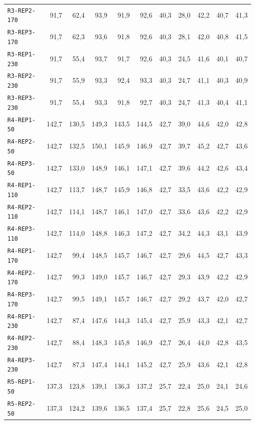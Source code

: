 \begin{longtable}{@{}lrrrrrrrrrr@{}}
\texttt{R3-REP2-170} & 91,7 & 62,4 & 93,9 & 91,9 & 92,6 & 40,3 & 28,0 & 42,2 & 40,7 & 41,3 \\
\texttt{R3-REP3-170} & 91,7 & 62,3 & 93,6 & 91,8 & 92,6 & 40,3 & 28,1 & 42,0 & 40,8 & 41,5 \\
\texttt{R3-REP1-230} & 91,7 & 55,4 & 93,7 & 91,7 & 92,6 & 40,3 & 24,5 & 41,6 & 40,1 & 40,7 \\
\texttt{R3-REP2-230} & 91,7 & 55,9 & 93,3 & 92,4 & 93,3 & 40,3 & 24,7 & 41,1 & 40,3 & 40,9 \\
\texttt{R3-REP3-230} & 91,7 & 55,4 & 93,3 & 91,8 & 92,7 & 40,3 & 24,7 & 41,3 & 40,4 & 41,1 \\
\texttt{R4-REP1-50} & 142,7 & 130,5 & 149,3 & 143,5 & 144,5 & 42,7 & 39,0 & 44,6 & 42,0 & 42,8 \\
\texttt{R4-REP2-50} & 142,7 & 132,5 & 150,1 & 145,9 & 146,9 & 42,7 & 39,7 & 45,2 & 42,7 & 43,6 \\
\texttt{R4-REP3-50} & 142,7 & 133,0 & 148,9 & 146,1 & 147,1 & 42,7 & 39,6 & 44,2 & 42,6 & 43,4 \\
\texttt{R4-REP1-110} & 142,7 & 113,7 & 148,7 & 145,9 & 146,8 & 42,7 & 33,5 & 43,6 & 42,2 & 42,9 \\
\texttt{R4-REP2-110} & 142,7 & 114,1 & 148,7 & 146,1 & 147,0 & 42,7 & 33,6 & 43,6 & 42,2 & 42,9 \\
\texttt{R4-REP3-110} & 142,7 & 114,0 & 148,8 & 146,3 & 147,2 & 42,7 & 34,2 & 44,3 & 43,1 & 43,9 \\
\texttt{R4-REP1-170} & 142,7 & 99,4 & 148,5 & 145,7 & 146,7 & 42,7 & 29,6 & 44,5 & 42,7 & 43,3 \\
\texttt{R4-REP2-170} & 142,7 & 99,3 & 149,0 & 145,7 & 146,7 & 42,7 & 29,3 & 43,9 & 42,2 & 42,9 \\
\texttt{R4-REP3-170} & 142,7 & 99,5 & 149,1 & 145,7 & 146,7 & 42,7 & 29,2 & 43,7 & 42,0 & 42,7 \\
\texttt{R4-REP1-230} & 142,7 & 87,4 & 147,6 & 144,3 & 145,4 & 42,7 & 25,9 & 43,3 & 42,1 & 42,7 \\
\texttt{R4-REP2-230} & 142,7 & 88,4 & 148,3 & 145,8 & 146,9 & 42,7 & 26,4 & 44,0 & 42,8 & 43,5 \\
\texttt{R4-REP3-230} & 142,7 & 87,3 & 147,4 & 144,1 & 145,2 & 42,7 & 25,9 & 43,6 & 42,1 & 42,8 \\
\texttt{R5-REP1-50} & 137,3 & 123,8 & 139,1 & 136,3 & 137,2 & 25,7 & 22,4 & 25,0 & 24,1 & 24,6 \\
\texttt{R5-REP2-50} & 137,3 & 124,2 & 139,6 & 136,5 & 137,4 & 25,7 & 22,8 & 25,6 & 24,5 & 25,0 \\

\end{longtable}
